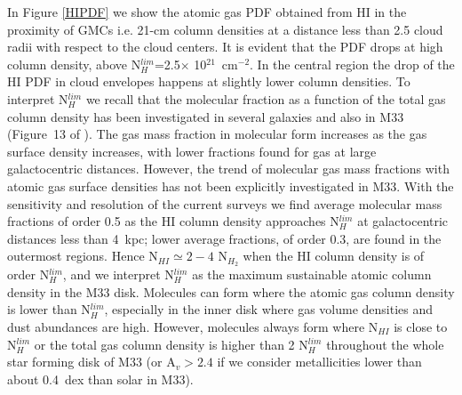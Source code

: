 \documentclass{aa}
\begin{document}
In Figure \ref{HIPDF} we show the  atomic gas PDF obtained from  HI in the proximity of GMCs 
i.e. 21-cm column densities   at a distance less than 
2.5 cloud radii with respect to the cloud centers. It is evident that the PDF drops at high 
column density, above N$_H^{lim}$=2.5$\times$ 10$^{21}$~cm$^{-2}$.
In the central region the drop of the HI PDF in cloud envelopes happens at slightly lower column
densities. To interpret N$_H^{lim}$ we recall that
the molecular fraction as a function of the total gas column density has
been investigated in several galaxies and also in M33 (Figure~13 of \citet{2007A&A...473...91G}).
The gas mass fraction in molecular form increases as the gas  
surface density increases, with lower fractions found for gas at large galactocentric distances.
However, the trend of molecular gas mass fractions with atomic gas surface densities   
has not been explicitly  investigated in M33. With the sensitivity and resolution of the current surveys
we find average molecular mass fractions of order 0.5 as the HI column density approaches N$_H^{lim}$
at galactocentric distances less than 4~kpc; lower average fractions, of order 0.3, are found in the 
outermost regions. Hence N$_{HI}\simeq 2-4$ N$_{H_2}$ when the HI column density 
is of order N$_H^{lim}$, and we interpret N$_H^{lim}$ as the maximum
sustainable atomic column density  in the M33 disk. Molecules can form  where the 
atomic gas column density is lower than N$_H^{lim}$, especially in the inner disk where gas volume densities 
and dust abundances are high.  However, molecules always form  
where N$_{HI}$ is close to N$_H^{lim}$ or the total gas column density is higher than 2 N$_H^{lim}$
throughout the whole star forming disk of M33 (or A$_v > 2.4 $ if we consider metallicities lower
than about 0.4~dex than solar in  M33).
 
\end{document}
